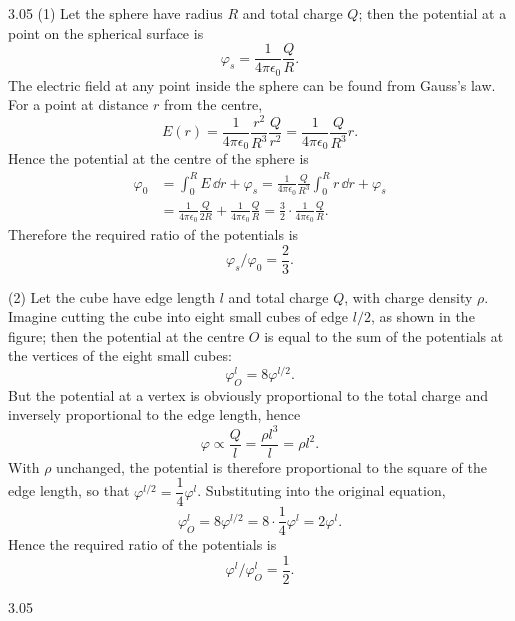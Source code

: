 \begin{solution}{3.05}
(1) Let the sphere have radius $R$ and total charge $Q$; then the potential at a point on the spherical surface is
\[
\varphi_s=\frac{1}{4\pi\epsilon_0}\frac{Q}{R}.
\]
The electric field at any point inside the sphere can be found from Gauss's law. For a point at distance $r$ from the centre,
\[
E(r)=\frac{1}{4\pi\epsilon_0}\frac{r^2}{R^3}\frac{Q}{r^2}
=\frac{1}{4\pi\epsilon_0}\frac{Q}{R^3}r.
\]
Hence the potential at the centre of the sphere is
\begin{align*}
\varphi_0&=\int_0^R E\,\dd r+\varphi_s
=\frac{1}{4\pi\epsilon_0}\frac{Q}{R^3}\int_0^R r\,\dd r+\varphi_s\\
&=\frac{1}{4\pi\epsilon_0}\frac{Q}{2R}+\frac{1}{4\pi\epsilon_0}\frac{Q}{R}
=\frac{3}{2}\cdot\frac{1}{4\pi\epsilon_0}\frac{Q}{R}.
\end{align*}
Therefore the required ratio of the potentials is
\[
\varphi_s/\varphi_0=\frac{2}{3}.
\]

(2) Let the cube have edge length $l$ and total charge $Q$, with charge density $\rho$. Imagine cutting the cube into eight small cubes of edge $l/2$, as shown in the figure; then the potential at the centre $O$ is equal to the sum of the potentials at the vertices of the eight small cubes:
\[
\varphi_O^{l}=8\varphi^{l/2}.
\]
But the potential at a vertex is obviously proportional to the total charge and inversely proportional to the edge length, hence
\[
\varphi\propto\frac{Q}{l}=\frac{\rho l^3}{l}=\rho l^2.
\]
With $\rho$ unchanged, the potential is therefore proportional to the square of the edge length, so that $\varphi^{l/2}=\dfrac{1}{4}\varphi^{l}$. Substituting into the original equation,
\[
\varphi_O^{l}=8\varphi^{l/2}=8\cdot\frac{1}{4}\varphi^{l}=2\varphi^{l}.
\]
Hence the required ratio of the potentials is
\[
\varphi^{l}/\varphi_O^{l}=\frac{1}{2}.
\]

\begin{figbox}{3.05}
\end{figbox}
\end{solution}

